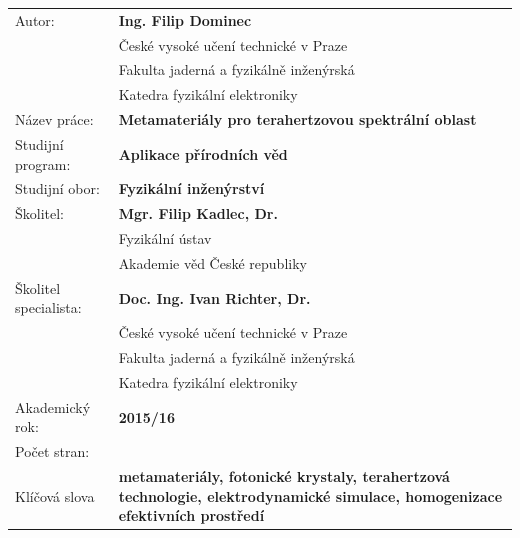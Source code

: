 \bgroup {}
\noindent\begin{tabular}{p{.30\linewidth}p{.65\linewidth}}
	Autor:				&\textbf{Ing. Filip Dominec} \\ 
					~	&České vysoké učení technické v Praze\\ 
					~	&Fakulta jaderná a fyzikálně inženýrská\\  
					~	&Katedra fyzikální elektroniky\\
Název práce:			&\textbf{Metamateriály pro terahertzovou spektrální oblast} \\
Studijní program:		&\textbf{Aplikace přírodních věd} \\
Studijní obor:			&\textbf{Fyzikální inženýrství} \\
Školitel:				&\textbf{Mgr. Filip Kadlec, Dr.} \\
					~	&Fyzikální ústav\\ 
					~	&Akademie věd České republiky\\  %
Školitel specialista:	&\textbf{Doc. Ing. Ivan Richter, Dr.} \\
					~	&České vysoké učení technické v Praze\\ 
					~	&Fakulta jaderná a fyzikálně inženýrská\\  
					~	&Katedra fyzikální elektroniky\\
Akademický rok:			&\textbf{2015/16} \\			%
Počet stran:			&\textbf{\pageref{enddocument}} \\  %
Klíčová slova			&\textbf{metamateriály, fotonické krystaly, terahertzová technologie, elektrodynamické simulace, homogenizace efektivních prostředí} \\
\end{tabular}
\egroup

\thispagestyle{empty} \newpage ~ \thispagestyle{empty} \newpage \setcounter{page}{1}

